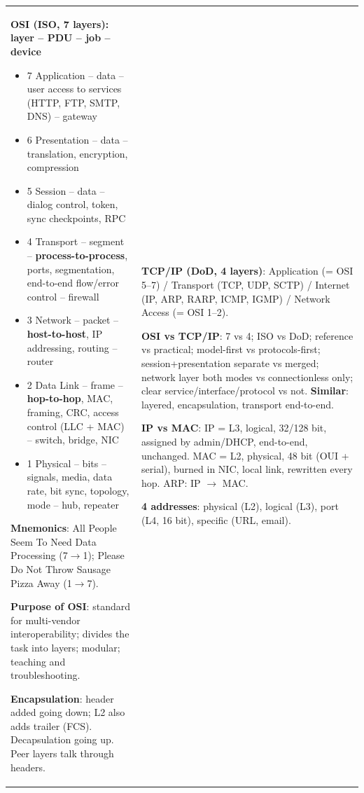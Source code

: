 \documentclass[10pt]{article}
\begin{document}
\newpage
\begin{cheatsheet}
\small
\begin{tabularx}{\linewidth}{@{}XX@{}}
\textbf{OSI (ISO, 7 layers): layer -- PDU -- job -- device}
\begin{itemize}
\item 7 Application -- data -- user access to services (HTTP, FTP, SMTP, DNS) -- gateway
\item 6 Presentation -- data -- translation, encryption, compression
\item 5 Session -- data -- dialog control, token, sync checkpoints, RPC
\item 4 Transport -- segment -- \textbf{process-to-process}, ports, segmentation, end-to-end flow/error control -- firewall
\item 3 Network -- packet -- \textbf{host-to-host}, IP addressing, routing -- router
\item 2 Data Link -- frame -- \textbf{hop-to-hop}, MAC, framing, CRC, access control (LLC + MAC) -- switch, bridge, NIC
\item 1 Physical -- bits -- signals, media, data rate, bit sync, topology, mode -- hub, repeater
\end{itemize}
\textbf{Mnemonics}: All People Seem To Need Data Processing (7$\to$1); Please Do Not Throw Sausage Pizza Away (1$\to$7).

\textbf{Purpose of OSI}: standard for multi-vendor interoperability; divides the task into layers; modular; teaching and troubleshooting.

\textbf{Encapsulation}: header added going down; L2 also adds trailer (FCS). Decapsulation going up. Peer layers talk through headers.
&
\textbf{TCP/IP (DoD, 4 layers)}: Application (= OSI 5--7) / Transport (TCP, UDP, SCTP) / Internet (IP, ARP, RARP, ICMP, IGMP) / Network Access (= OSI 1--2).

\textbf{OSI vs TCP/IP}: 7 vs 4; ISO vs DoD; reference vs practical; model-first vs protocols-first; session+presentation separate vs merged; network layer both modes vs connectionless only; clear service/interface/protocol vs not.
\textbf{Similar}: layered, encapsulation, transport end-to-end.

\textbf{IP vs MAC}: IP = L3, logical, 32/128 bit, assigned by admin/DHCP, end-to-end, unchanged. MAC = L2, physical, 48 bit (OUI + serial), burned in NIC, local link, rewritten every hop. ARP: IP $\to$ MAC.

\textbf{4 addresses}: physical (L2), logical (L3), port (L4, 16 bit), specific (URL, email).


\end{tabularx}
\end{cheatsheet}
\end{document}
